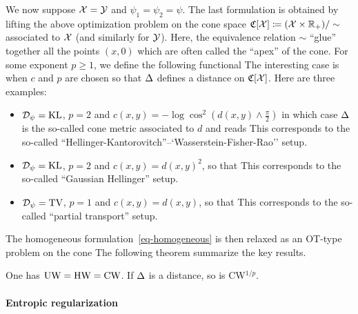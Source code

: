 We now suppose $\mathcal{X}=\mathcal{Y}$ and $\psi_1=\psi_2=\psi$.
%
The last formulation is obtained by lifting the above optimization problem on the cone space $\mathfrak{C}[\mathcal{X}] \coloneqq (\mathcal{X} \times \mathbb{R}_+) / \sim$   associated to $\mathcal{X}$ (and similarly for $\mathcal{Y}$). Here, the equivalence relation $\sim$ ``glue'' together all the points $(x,0)$ which are often called the ``apex'' of the cone. For some exponent $p \geq 1$, we define the following functional 
The interesting case is when $c$ and $p$ are chosen so that $\Delta$ defines a distance on $\mathfrak{C}[\mathcal{X}]$. Here are three examples:
\begin{itemize}
	\item $\mathcal{D}_\psi=\operatorname{KL}$, $p=2$ and $c(x,y)=-\log \cos^2(d(x,y) \wedge \frac{\pi}{2})$ in which case $\Delta$ is the so-called cone metric associated to $d$ and reads
		This corresponds to the so-called ``Hellinger-Kantorovitch''--`Wasserstein-Fisher-Rao'' setup.
	\item $\mathcal{D}_\psi=\operatorname{KL}$, $p=2$ and $c(x,y)=d(x,y)^2$, so that 
		This corresponds to the so-called ``Gaussian Hellinger'' setup.
	\item $\mathcal{D}_\psi=\operatorname{TV}$, $p=1$ and $c(x,y)=d(x,y)$, so that 
		This corresponds to the so-called ``partial transport'' setup.
\end{itemize}
The homogeneous formulation~\eqref{eq-homogeneous} is then relaxed as an OT-type problem on the cone
The following theorem summarize the key results.

\begin{thm}
	One has $\text{\upshape UW}=\text{\upshape HW}=\text{\upshape CW}$. If $\Delta$ is a distance, so is {\upshape CW}$^{1/p}$. 
\end{thm}


\paragraph{Entropic regularization}


